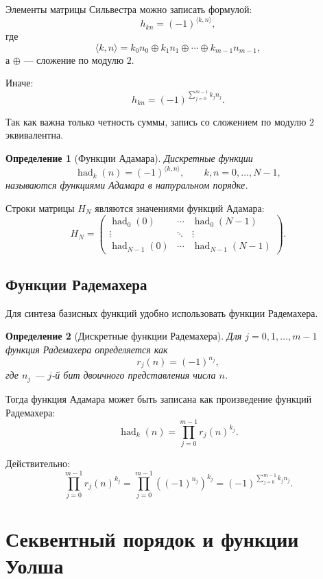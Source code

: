 \documentclass[12pt,a4paper]{article}
\newtheorem{definition}{Определение}
\begin{document}
Элементы матрицы Сильвестра можно записать формулой:
\[
    h_{kn}=(-1)^{\langle k,n\rangle},
\]
где
\[
    \langle k,n\rangle
    =
    k_0n_0\oplus k_1n_1\oplus\cdots\oplus k_{m-1}n_{m-1},
\]
а $\oplus$ --- сложение по модулю $2$.

Иначе:
\[
    h_{kn}=(-1)^{\sum_{j=0}^{m-1} k_j n_j}.
\]

Так как важна только четность суммы, запись со сложением по модулю $2$ эквивалентна.

\begin{definition}[Функции Адамара]
Дискретные функции
\[
    \operatorname{had}_k(n)=(-1)^{\langle k,n\rangle},
    \qquad k,n=0,\ldots,N-1,
\]
называются функциями Адамара в натуральном порядке.
\end{definition}

Строки матрицы $H_N$ являются значениями функций Адамара:
\[
    H_N=
    \begin{pmatrix}
        \operatorname{had}_0(0)&\cdots&\operatorname{had}_0(N-1)\\
        \vdots&\ddots&\vdots\\
        \operatorname{had}_{N-1}(0)&\cdots&\operatorname{had}_{N-1}(N-1)
    \end{pmatrix}.
\]

\subsection{Функции Радемахера}

Для синтеза базисных функций удобно использовать функции Радемахера.

\begin{definition}[Дискретные функции Радемахера]
Для $j=0,1,\ldots,m-1$ функция Радемахера определяется как
\[
    r_j(n)=(-1)^{n_j},
\]
где $n_j$ --- $j$-й бит двоичного представления числа $n$.
\end{definition}

Тогда функция Адамара может быть записана как произведение функций Радемахера:
\[
    \operatorname{had}_k(n)
    =
    \prod_{j=0}^{m-1} r_j(n)^{k_j}.
\]

Действительно:
\[
    \prod_{j=0}^{m-1} r_j(n)^{k_j}
    =
    \prod_{j=0}^{m-1} \left((-1)^{n_j}\right)^{k_j}
    =
    (-1)^{\sum_{j=0}^{m-1}k_jn_j}.
\]

\section{Секвентный порядок и функции Уолша}
\end{document}
